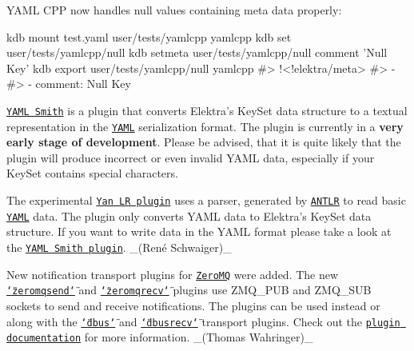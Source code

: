 \begin{DoxyItemize}
\item Y\+A\+ML C\+PP now handles null values containing meta data properly\+:
\end{DoxyItemize}


\begin{DoxyCode}
kdb mount test.yaml user/tests/yamlcpp yamlcpp
kdb set user/tests/yamlcpp/null
kdb setmeta user/tests/yamlcpp/null comment 'Null Key'
kdb export user/tests/yamlcpp/null yamlcpp
#> !<!elektra/meta>
#> - ~
#> - comment: Null Key
\end{DoxyCode}



\begin{DoxyItemize}
\item \href{http://libelektra.org/plugins/yamlsmith}{\tt Y\+A\+ML Smith} is a plugin that converts Elektra’s {\ttfamily Key\+Set} data structure to a textual representation in the \href{http://yaml.org}{\tt Y\+A\+ML} serialization format. The plugin is currently in a {\bfseries very early stage of development}. Please be advised, that it is quite likely that the plugin will produce incorrect or even invalid Y\+A\+ML data, especially if your {\ttfamily Key\+Set} contains special characters.
\end{DoxyItemize}


\begin{DoxyItemize}
\item The experimental \href{http://libelektra.org/plugins/yanlr}{\tt Yan LR plugin} uses a parser, generated by \href{http://www.antlr.org}{\tt A\+N\+T\+LR} to read basic \href{http://yaml.org}{\tt Y\+A\+ML} data. The plugin only converts Y\+A\+ML data to Elektra’s {\ttfamily Key\+Set} data structure. If you want to write data in the Y\+A\+ML format please take a look at the \href{http://libelektra.org/plugins/yamlsmith}{\tt Y\+A\+ML Smith plugin}. \+\_\+(René Schwaiger)\+\_\+
\end{DoxyItemize}


\begin{DoxyItemize}
\item New notification transport plugins for \href{http://zeromq.org/}{\tt Zero\+MQ} were added. The new \href{https://www.libelektra.org/plugins/zeromqsend}{\tt \char`\"{}zeromqsend\char`\"{}} and \href{https://www.libelektra.org/plugins/zeromqrecv}{\tt \char`\"{}zeromqrecv\char`\"{}} plugins use {\ttfamily Z\+M\+Q\+\_\+\+P\+UB} and {\ttfamily Z\+M\+Q\+\_\+\+S\+UB} sockets to send and receive notifications. The plugins can be used instead or along with the \href{https://www.libelektra.org/plugins/dbus}{\tt \char`\"{}dbus\char`\"{}} and \href{https://www.libelektra.org/plugins/dbusrecv}{\tt \char`\"{}dbusrecv\char`\"{}} transport plugins. Check out the \href{https://www.libelektra.org/plugins/zeromqrecv}{\tt plugin documentation} for more information. \+\_\+(\+Thomas Wahringer)\+\_\+
\end{DoxyItemize}


